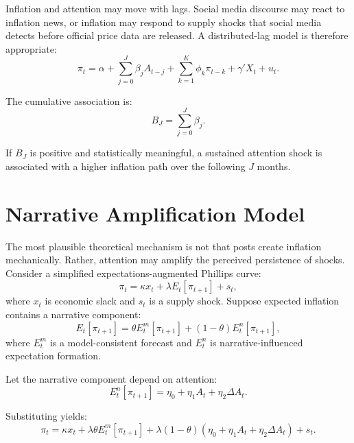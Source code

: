 \documentclass[12pt]{article}
\begin{document}
Inflation and attention may move with lags. Social media discourse may react to inflation news, or inflation may respond to supply shocks that social media detects before official price data are released. A distributed-lag model is therefore appropriate:
\begin{equation}
    \pi_t =
    \alpha
    + \sum_{j=0}^{J} \beta_j A_{t-j}
    + \sum_{k=1}^{K} \phi_k \pi_{t-k}
    + \gamma'X_t
    + u_t.
    \label{eq:distributed_lag}
\end{equation}

The cumulative association is:
\begin{equation}
    B_J = \sum_{j=0}^{J} \beta_j.
\end{equation}

If $B_J$ is positive and statistically meaningful, a sustained attention shock is associated with a higher inflation path over the following $J$ months.

\section{Narrative Amplification Model}

The most plausible theoretical mechanism is not that posts create inflation mechanically. Rather, attention may amplify the perceived persistence of shocks. Consider a simplified expectations-augmented Phillips curve:
\begin{equation}
    \pi_t = \kappa x_t + \lambda E_t[\pi_{t+1}] + s_t,
\end{equation}
where $x_t$ is economic slack and $s_t$ is a supply shock. Suppose expected inflation contains a narrative component:
\begin{equation}
    E_t[\pi_{t+1}] =
    \theta E_t^{m}[\pi_{t+1}]
    + (1-\theta) E_t^{n}[\pi_{t+1}],
\end{equation}
where $E_t^{m}$ is a model-consistent forecast and $E_t^{n}$ is narrative-influenced expectation formation.

Let the narrative component depend on attention:
\begin{equation}
    E_t^{n}[\pi_{t+1}] = \eta_0 + \eta_1 A_t + \eta_2 \Delta A_t.
\end{equation}

Substituting yields:
\begin{equation}
    \pi_t =
    \kappa x_t
    + \lambda \theta E_t^{m}[\pi_{t+1}]
    + \lambda(1-\theta)(\eta_0 + \eta_1 A_t + \eta_2 \Delta A_t)
    + s_t.
\end{equation}
\end{document}
